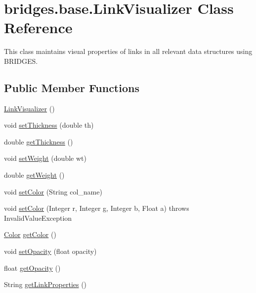 \hypertarget{classbridges_1_1base_1_1_link_visualizer}{}\section{bridges.\+base.\+Link\+Visualizer Class Reference}
\label{classbridges_1_1base_1_1_link_visualizer}


This class maintains visual properties of links in all relevant data structures using B\+R\+I\+D\+G\+ES.  


\subsection*{Public Member Functions}
\begin{DoxyCompactItemize}
\item 
\hyperlink{classbridges_1_1base_1_1_link_visualizer_a0b69f099fa264ae9097b0efe278c6a1b}{Link\+Visualizer} ()
\item 
void \hyperlink{classbridges_1_1base_1_1_link_visualizer_a702e9ca345d1a4a035baf2041f275849}{set\+Thickness} (double th)
\item 
double \hyperlink{classbridges_1_1base_1_1_link_visualizer_af1592d2a8664b00c1a51fdc0f8d1860a}{get\+Thickness} ()
\item 
void \hyperlink{classbridges_1_1base_1_1_link_visualizer_a21d5884d243cf5a08f9d544f5083a44c}{set\+Weight} (double wt)
\item 
double \hyperlink{classbridges_1_1base_1_1_link_visualizer_ac96d7fb118ae6c7e1bdd57c5e2c8639a}{get\+Weight} ()
\item 
void \hyperlink{classbridges_1_1base_1_1_link_visualizer_a92f306dbd73b961befa8ab4c0620a89e}{set\+Color} (String col\+\_\+name)
\item 
void \hyperlink{classbridges_1_1base_1_1_link_visualizer_a003905cfe33e1704555b2b3a1cf99bad}{set\+Color} (Integer r, Integer g, Integer b, Float a)  throws Invalid\+Value\+Exception 
\item 
\hyperlink{classbridges_1_1base_1_1_color}{Color} \hyperlink{classbridges_1_1base_1_1_link_visualizer_a3ed52d98ecab99c6d8dd136fba913b7d}{get\+Color} ()
\item 
void \hyperlink{classbridges_1_1base_1_1_link_visualizer_ac0d59614dbc65ed0a19c25c493a1deaa}{set\+Opacity} (float opacity)
\item 
float \hyperlink{classbridges_1_1base_1_1_link_visualizer_a07cdd435a54e4b612ad63614f2a27a4a}{get\+Opacity} ()
\item 
String \hyperlink{classbridges_1_1base_1_1_link_visualizer_ab64d9b7e2b99f7ebce80cbabfe4adf2a}{get\+Link\+Properties} ()
\end{DoxyCompactItemize}


